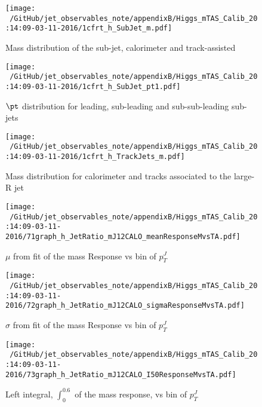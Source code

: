 \begin{figure}
 
\texttt{[image: ~/GitHub/jet\_observables\_note/appendixB/Higgs\_mTAS\_Calib\_20:14:09-03-11-2016/1cfrt\_h\_SubJet\_m.pdf]}
\caption{Mass distribution of the sub-jet, calorimeter and track-assisted}
 
\end{figure}
% 
\begin{figure}
 
\texttt{[image: ~/GitHub/jet\_observables\_note/appendixB/Higgs\_mTAS\_Calib\_20:14:09-03-11-2016/1cfrt\_h\_SubJet\_pt1.pdf]}
\caption{$\pt$ distribution for leading, sub-leading and sub-sub-leading sub-jets}
 
\end{figure}
\begin{figure}
 
\texttt{[image: ~/GitHub/jet\_observables\_note/appendixB/Higgs\_mTAS\_Calib\_20:14:09-03-11-2016/1cfrt\_h\_TrackJets\_m.pdf]}
\caption{Mass distribution for calorimeter and tracks associated to the large-R jet}
 
\end{figure}

%

\begin{figure}

\texttt{[image: ~/GitHub/jet\_observables\_note/appendixB/Higgs\_mTAS\_Calib\_20:14:09-03-11-2016/71graph\_h\_JetRatio\_mJ12CALO\_meanResponseMvsTA.pdf]}
\caption{$\mu $ from fit of the mass Response vs bin of  $p_{T}^{J}$}

\end{figure}
\begin{figure}

\texttt{[image: ~/GitHub/jet\_observables\_note/appendixB/Higgs\_mTAS\_Calib\_20:14:09-03-11-2016/72graph\_h\_JetRatio\_mJ12CALO\_sigmaResponseMvsTA.pdf]}
\caption{$\sigma $ from fit of the mass Response vs bin of $p_{T}^{J}$}

\end{figure}

\begin{figure}

\texttt{[image: ~/GitHub/jet\_observables\_note/appendixB/Higgs\_mTAS\_Calib\_20:14:09-03-11-2016/73graph\_h\_JetRatio\_mJ12CALO\_I50ResponseMvsTA.pdf]}
\caption{Left integral, $\int_{0}^{0.6} $ of the mass response, vs bin of  $p_{T}^{J}$}

\end{figure}

